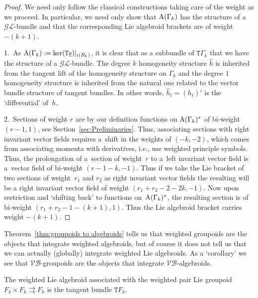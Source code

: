 \documentclass[pdftex]{sigma}
\newcommand{\rmA}{\textnormal{A}}
\def\sT{{\mathtt T}}
\numberwithin{equation}{section}
\begin{document}
\begin{proof}
We need only follow the classical constructions taking care of the weight as we proceed. In particular, we need only show that $\rmA(\Gamma_{k})$ has the structure of a $\mathcal{GL}$-bundle and that the corresponding Lie algebroid brackets are of weight~$-(k+1)$.

 1.~As  $\rmA(\Gamma_{k}) :=  \ker ( \sT\underline{s}  )  |_{\iota(B_{k})}$, it is clear that as a subbundle of $\sT \Gamma_{k}$ that we have the structure of a  $\mathcal{GL}$-bundle. The degree  $k$ homogeneity structure $\widehat{h}$ is inherited from the tangent lift of the homogeneity structure on $\Gamma_{k}$ and the degree $1$ homogeneity structure is inherited from the natural one related to the vector bundle structure of tangent bundles. In other words, $\widehat{h}_t=(h_t)'$ is the `dif\/ferential' of~$h$.

 2.~Sections of weight $r$  are by our def\/inition functions on $\rmA(\Gamma_{k})^{*}$ of bi-weight $(r-1,1)$, see Section~\ref{sec:Preliminaries}.  Thus, associating sections with right invariant vector f\/ields requires a~shift in the weights of $(-k, -2)$, which comes from associating momenta with derivatives, i.e., use weighted principle symbols. Thus, the prolongation of a~section of weight~$r$ to a~left invariant vector f\/ield is a~vector f\/ield  of bi-weight $(r-1-k,-1)$.  Thus if we take the Lie bracket of two sections of weight~$r_{1}$ and $r_{2}$ as right invariant vector f\/ields the resulting will be a  right invariant vector f\/ield of weight $(r_{1}+ r_{2}- 2 - 2k, -1)$. Now upon restriction and  `shifting back' to functions on~$\rmA(\Gamma_{k})^{*}$, the resulting section is of bi-weight $(r_{1}+ r_{2} -1 -(k+1), 1)$. Thus the Lie algebroid bracket carries weight $-(k+1)$.
\end{proof}



Theorem~\ref{thm:groupoids to algebroids} tells us that weighted groupoids are the objects that integrate weighted algebroids, but of course it does not tell us that we can actually (globally) integrate weighted Lie algebroids.  As a `corollary' we see that $\mathcal{VB}$-groupoids are the objects that integrate $\mathcal{VB}$-algebroids.

\begin{Example}
The weighted Lie algebroid associated with the weighted pair Lie groupoid $F_{k}\times F_{k} \rightrightarrows F_{k}$  is the tangent bundle $\sT F_{k}$.
\end{Example}
\end{document}
